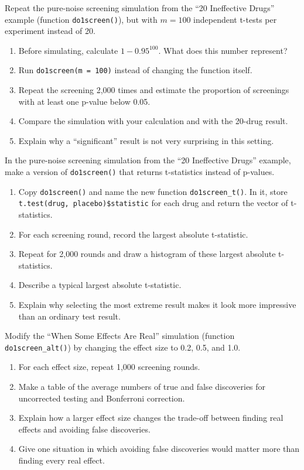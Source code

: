 \begin{exercise}
Repeat the pure-noise screening simulation from the ``20 Ineffective
Drugs'' example (function \lstinline{do1screen()}), but with
$m = 100$ independent t-tests per experiment instead of 20.
\begin{enumerate}[label=(\alph*)]
\item Before simulating, calculate $1 - 0.95^{100}$. What does this
  number represent?
\item Run \lstinline{do1screen(m = 100)} instead of changing the
  function itself.
\item Repeat the screening 2,000 times and estimate the proportion of
  screenings with at least one p-value below 0.05.
\item Compare the simulation with your calculation and with the
  20-drug result.
\item Explain why a ``significant'' result is not very surprising in
  this setting.
\end{enumerate}
\end{exercise}

\begin{exercise}
In the pure-noise screening simulation from the ``20 Ineffective
Drugs'' example, make a version of \lstinline{do1screen()} that
returns t-statistics instead of p-values.
\begin{enumerate}[label=(\alph*)]
\item Copy \lstinline{do1screen()} and name the new function
  \lstinline{do1screen_t()}. In it, store
  \lstinline{t.test(drug, placebo)$statistic} for each drug and return
  the vector of t-statistics.
\item For each screening round, record the largest absolute t-statistic.
\item Repeat for 2,000 rounds and draw a histogram of these largest
  absolute t-statistics.
\item Describe a typical largest absolute t-statistic.
\item Explain why selecting the most extreme result makes it look more
  impressive than an ordinary test result.
\end{enumerate}
\end{exercise}

\begin{exercise}
Modify the ``When Some Effects Are Real'' simulation (function
\lstinline{do1screen_alt()}) by changing the effect size to 0.2, 0.5,
and 1.0.
\begin{enumerate}[label=(\alph*)]
\item For each effect size, repeat 1,000 screening rounds.
\item Make a table of the average numbers of true and false discoveries
  for uncorrected testing and Bonferroni correction.
\item Explain how a larger effect size changes the trade-off between
  finding real effects and avoiding false discoveries.
\item Give one situation in which avoiding false discoveries would
  matter more than finding every real effect.
\end{enumerate}
\end{exercise}

